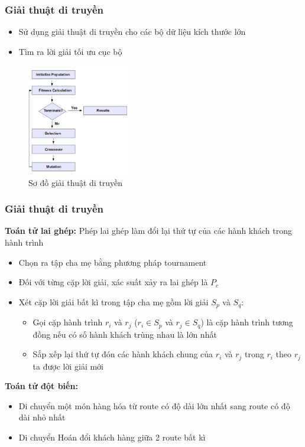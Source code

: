 \documentclass{beamer}
\begin{document}
	\begin{frame}
		\frametitle{Giải thuật di truyền}
		\begin{itemize}
			\item Sử dụng giải thuật di truyền cho các bộ dữ liệu kích thước lớn
			\item Tìm ra lời giải tối ưu cục bộ
		\end{itemize}
		\begin{figure}
			\centering
			\caption{Sơ đồ giải thuật di truyền}
			\includegraphics[width=0.4\textwidth]{images/ga-flow.png}
		\end{figure}
	\end{frame}

	\begin{frame}
		\frametitle{Giải thuật di truyền}
		\textbf{Toán tử lai ghép:} Phép lai ghép làm đổi lại thứ tự của các hành khách trong hành trình
		\begin{itemize}
			\item Chọn ra tập cha mẹ bằng phương pháp tournament
			\item Đối với từng cặp lời giải, xác suất xảy ra lai ghép là $P_c$
			\item Xét cặp lời giải bất kì trong tập cha mẹ gồm lời giải $S_p$ và $S_q$:
				\begin{itemize}
					\item Gọi cặp hành trình $r_i$ và $r_j$ ($r_i \in S_p$ và $r_j \in S_q$) là cặp hành trình tương đồng nếu có số hành khách trùng nhau là lớn nhất
					\item Sắp xếp lại thứ tự đón các hành khách chung của $r_i$ và $r_j$ trong $r_i$ theo $r_j$ ta được lời giải mới
				\end{itemize}
		\end{itemize}
	
		\textbf{Toán tử đột biến:}
		\begin{itemize}
			\item Di chuyển một món hàng hóa từ route có độ dài lớn nhất sang route có độ dài nhỏ nhất
			\item Di chuyển Hoán đổi khách hàng giữa 2 route bất kì
		\end{itemize}
	\end{frame}
	
\end{document}
